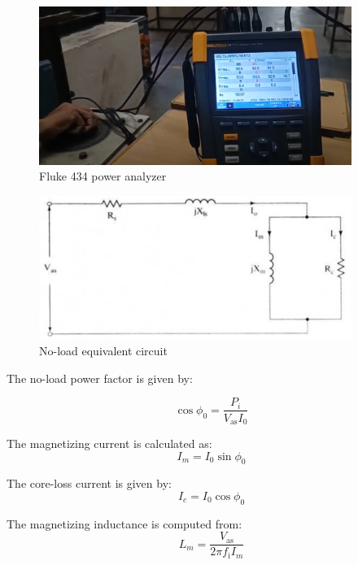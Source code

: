 
\begin{figure}
	\centering
	\includegraphics[width=4in]{sections/section5/images/ParamEstim/FlukeVoltAmpHertz.png}
	\caption{Fluke 434 power analyzer}
	\label{fig:fluke434}
\end{figure}


\begin{figure}
	\centering
	\includegraphics[width=4in]{sections/section5/images/ParamEstim/noloadCircuitKrish.png}
	\caption{No-load equivalent circuit}
	\label{fig:no_load_test}
\end{figure}

The no-load power factor is given by:

\begin{equation}
\cos \phi_0 = \frac{P_i}{V_\text{as}I_0}
\end{equation}

The magnetizing current is calculated as:
\begin{equation}
I_m = I_0 \sin \phi_0
\end{equation}

The core-loss current is given by:
\begin{equation}
I_c = I_0 \cos \phi_0
\end{equation}

The magnetizing inductance is computed from:
\begin{equation}
L_m = \frac{V_\text{as}}{2\pi f_\text{i}I_m}
\end{equation}

